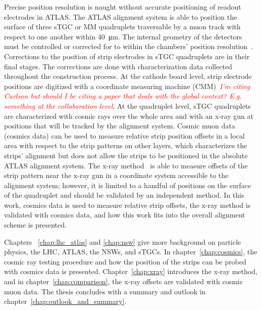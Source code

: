 
Precise position resolution is naught without accurate positioning of readout electrodes in ATLAS. The ATLAS alignment system is able to position the surface of three sTGC or MM quadruplets traversable by a muon track with respect to one another within \SI{40}{\micro\meter}. The internal geometry of the detectors must be controlled or corrected for to within the chambers' position resolution~\cite{nsw_tdr}. Corrections to the position of strip electrodes in sTGC quadruplets are in their final stages. The corrections are done with characterization data collected throughout the construction process. At the cathode board level, strip electrode positions are digitized with a coordinate measuring machine (CMM)~\cite{carlson_results_2019}\textcolor{red}{\textit{I'm citing Carlson but should I be citing a paper that deals with the global context? E.g. something at the collaboration level}}. At the quadruplet level, sTGC quadruplets are characterized with cosmic rays over the whole area and with an x-ray gun at positions that will be tracked by the alignment system. Cosmic muon data (cosmics data) can be used to measure relative strip position offsets in a local area with respect to the strip patterns on other layers, which characterizes the strips' alignment but does not allow the strips to be positioned in the absolute ATLAS alignment system. The x-ray method~\cite{lefebvre_precision_2020} is able to measure offsets of the strip pattern near the x-ray gun in a coordinate system accessible to the alignment system; however, it is limited to a handful of positions on the surface of the quadruplet and should be validated by an independent method. In this work, cosmics data is used to measure relative strip offsets, the x-ray method is validated with cosmics data, and how this work fits into the overall alignment scheme is presented.

Chapters ~\ref{chap:lhc_atlas} and \ref{chap:nsw} give more background on particle physics, the LHC, ATLAS, the NSWs, and sTGCs. In chapter~\ref{chap:cosmics}, the cosmic ray testing procedure and how the position of the strips can be probed with cosmics data is presented. Chapter~\ref{chap:xray} introduces the x-ray method, and in chapter~\ref{chap:comparison}, the x-ray offsets are validated with cosmic muon data. The thesis concludes with a summary and outlook in chapter~\ref{chap:outlook_and_summary}.

